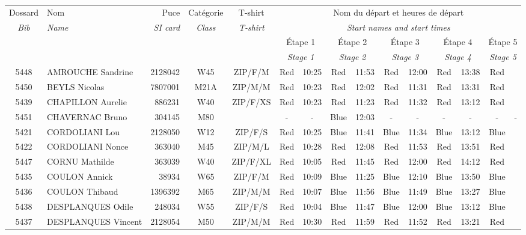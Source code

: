 \documentclass{report}
\begin{document}
  \begin{longtable}{|c|l|r|c|c|*{5}{cc|}}
    Dossard & Nom  & Puce    & Catégorie & T-shirt & \multicolumn{10}{c|}{Nom du départ et heures de départ} \\
    \itshape Bib     & \itshape Name & \itshape SI card & \itshape Class  & \itshape  T-shirt  & \multicolumn{10}{c|}{\itshape Start names and start times} \\
    \hline
    & & & & & \multicolumn{2}{c|}{Étape 1} & \multicolumn{2}{c|}{Étape 2} & \multicolumn{2}{c|}{Étape 3} & \multicolumn{2}{c|}{Étape 4} & \multicolumn{2}{c|}{Étape 5} \\
    & & & & & \multicolumn{2}{c|}{\itshape Stage 1} & \multicolumn{2}{c|}{\itshape Stage 2} & \multicolumn{2}{c|}{\itshape Stage 3} & \multicolumn{2}{c|}{\itshape Stage 4} & \multicolumn{2}{c|}{\itshape Stage 5} \\
    \hline
    5448 & AMROUCHE Sandrine & 2128042 & W45 & ZIP/F/M & Red & 10:25 & Red & 11:53 & Red & 12:00 & Red & 13:38 & Red &  \\
    5450 & BEYLS Nicolas & 7807001 & M21A & ZIP/M/M & Red & 10:23 & Red & 12:02 & Red & 11:31 & Red & 13:31 & Red &  \\
    5439 & CHAPILLON Aurelie & 886231 & W40 & ZIP/F/XS & Red & 10:23 & Red & 11:23 & Red & 11:32 & Red & 13:12 & Red &  \\
    5451 & CHAVERNAC Bruno & 304145 & M80 &   & - &  - & Blue & 12:03 & - &  - & - &  - & - &  -\\
    5421 & CORDOLIANI Lou & 2128050 & W12 & ZIP/F/S & Red & 10:25 & Blue & 11:41 & Blue & 11:34 & Blue & 13:12 & Blue &  \\
    5422 & CORDOLIANI Nonce & 363040 & M45 & ZIP/M/L & Red & 10:28 & Red & 12:08 & Red & 11:53 & Red & 13:51 & Red &  \\
    5447 & CORNU Mathilde & 363039 & W40 & ZIP/F/XL & Red & 10:05 & Red & 11:45 & Red & 12:00 & Red & 14:12 & Red &  \\
    5435 & COULON Annick & 38934 & W65 & ZIP/F/M & Red & 10:09 & Blue & 11:25 & Blue & 12:10 & Blue & 13:50 & Blue &  \\
    5436 & COULON Thibaud & 1396392 & M65 & ZIP/M/M & Red & 10:07 & Blue & 11:56 & Blue & 11:49 & Blue & 13:27 & Blue &  \\
    5438 & DESPLANQUES Odile & 248034 & W55 & ZIP/F/S & Red & 10:04 & Blue & 11:47 & Blue & 12:00 & Blue & 13:12 & Blue &  \\
    5437 & DESPLANQUES Vincent & 2128054 & M50 & ZIP/M/M & Red & 10:30 & Red & 11:59 & Red & 11:52 & Red & 13:21 & Red &  \\

\end{longtable}
\end{document}
